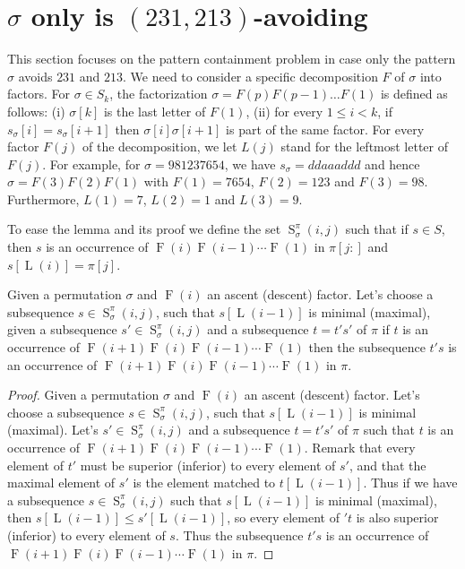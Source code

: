 \documentclass[a4paper]{llncs}
\newcommand{\ptext}{\pi}
\newcommand{\pmotif}{\sigma}
\DeclareMathOperator{\firsta}{L}
\newcommand{\first}[1]{\firsta({#1})}
\DeclareMathOperator{\factora}{F}
\newcommand{\factor}[1]{\factora({#1})}
\DeclareMathOperator{\SETa}{S}
\newcommand{\SET}[4]{\SETa_{{#1}}^{{#2}}({#3},{#4})}
\begin{document}

\section{$\sigma$ only is $(231,213)$-avoiding}
\label{section:sigma only avoid 231 and 213}

This section focuses on the pattern containment problem
in case only the pattern $\sigma$ avoids $231$ and $213$.
We need to consider a specific decomposition $F$ of $\sigma$ into factors.
For $\sigma \in S_k$, the factorization
$\sigma = F(p) F(p-1) \ldots F(1)$ is defined as follows:
(i) $\sigma[k]$ is the last letter of $F(1)$,
(ii) for every $1 \leq i < k$,
if $s_\sigma[i] = s_\sigma[i+1]$ then
$\sigma[i]\sigma[i+1]$ is part of the same factor.
For every factor $F(j)$ of the decomposition, we let
$L(j)$ stand for the leftmost letter of $F(j)$.
For example,
for $\sigma = 981237654$,
we have
$s_\sigma = ddaaaddd$ and hence
$\sigma = F(3) F(2) F(1)$ with
$F(1) =7654$, $F(2) = 123$ and $F(3) = 98$.
Furthermore,
$L(1) = 7$, $L(2) = 1$ and $L(3) = 9$.

To ease the lemma and its proof we define the set $\SET{\pmotif}{\ptext}{i}{j}$ such that if $s \in S$, then $s$ is an occurrence of $\factor{i} \factor{i-1} \cdots \factor{1}$ in $\ptext[j:]$ and $s[\first{i}]=\ptext[j]$.

\begin{lemma}
Given a permutation $\pmotif$ and $\factor{i}$ an ascent (descent) factor.
Let's choose a subsequence $s \in \SET{\pmotif}{\ptext}{i}{j}$, such that $s[\first{i-1}]$ is minimal (maximal), given a subsequence
$s' \in \SET{\pmotif}{\ptext}{i}{j}$ and a subsequence $t=t's'$ of $\ptext$  if $t$ is an occurrence of $\factor{i+1} \factor{i} \factor{i-1} \cdots \factor{1}$ then the subsequence $t's$ is an occurrence of $\factor{i+1} \factor{i} \factor{i-1} \cdots \factor{1}$ in $\ptext$.
\end{lemma}

\begin{proof}
Given a permutation $\pmotif$ and $\factor{i}$ an ascent (descent) factor.
Let's choose a subsequence $s \in \SET{\pmotif}{\ptext}{i}{j}$, such that $s[\first{i-1}]$ is minimal (maximal).
Let's $s' \in \SET{\pmotif}{\ptext}{i}{j}$ and a subsequence $t=t's'$ of $\ptext$ such that $t$ is an occurrence of $\factor{i+1}\factor{i}\factor{i-1}\cdots\factor{1}$. 
Remark that every element of $t'$ must be superior (inferior) to every element of $s'$, and that the maximal element of $s'$ is the element matched to $t[\first{i-1}]$. Thus if we have a subsequence $s \in \SET{\pmotif}{\ptext}{i}{j}$ such that $s[\first{i-1}]$ is minimal (maximal), then $s[\first{i-1}]\leq s'[\first{i-1}]$, so every element of $'t$ is also superior (inferior) to every element of $s$. Thus the subsequence $t's$ is an occurrence of $\factor{i+1}\factor{i}\factor{i-1}\cdots\factor{1}$ in $\ptext$.
\end{proof}
\end{document}
